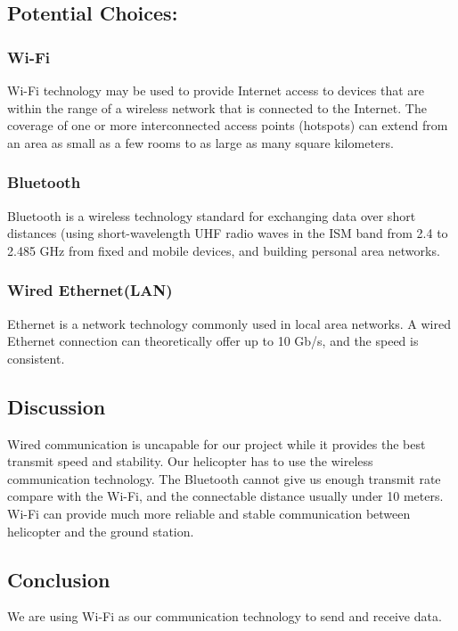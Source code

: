 \documentclass[letterpaper, 10, draftclsnofoot, onecolumn]{IEEEtran}
\begin{document}
\subsection{Potential Choices:}
\subsubsection{Wi-Fi}
Wi-Fi technology may be used to provide Internet access to devices that are within the range of a wireless network that is connected to the Internet. The coverage of one or more interconnected access points (hotspots) can extend from an area as small as a few rooms to as large as many square kilometers. \cite{r3}
\subsubsection{Bluetooth}
Bluetooth is a wireless technology standard for exchanging data over short distances (using short-wavelength UHF radio waves in the ISM band from 2.4 to 2.485 GHz from fixed and mobile devices, and building personal area networks.\cite{r4}
\subsubsection{Wired Ethernet(LAN)}
Ethernet is a network technology commonly used in local area networks. A wired Ethernet connection can theoretically offer up to 10 Gb/s, and the speed is consistent.
\subsection{Discussion}
Wired communication is uncapable for our project while it provides the best transmit speed and stability. Our helicopter has to use the wireless communication technology. The Bluetooth cannot give us enough transmit rate compare with the Wi-Fi, and the connectable distance usually under 10 meters. Wi-Fi can provide much more reliable and stable communication between helicopter and the ground station.
\subsection{Conclusion}
We are using Wi-Fi as our communication technology to send and receive data.




\end{document}
